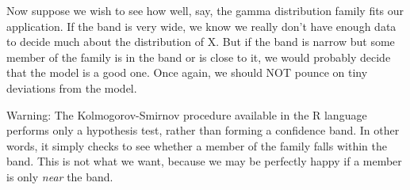 Now suppose we wish to see how well, say, the gamma distribution family
fits our application.  If the band is very wide, we know we really don't
have enough data to decide much about the distribution of X.  But if the
band is narrow but some member of the family is in the band or is close
to it, we would probably decide that the model is a good one.  Once
again, we should NOT pounce on tiny deviations from the model.

Warning:  The Kolmogorov-Smirnov procedure available in
the R language performs only a hypothesis test, rather than forming a
confidence band.  In other words, it simply checks to see whether a
member of the family falls within the band.  This is not what we want,
because we may be perfectly happy if a member is only {\it near} the
band.


